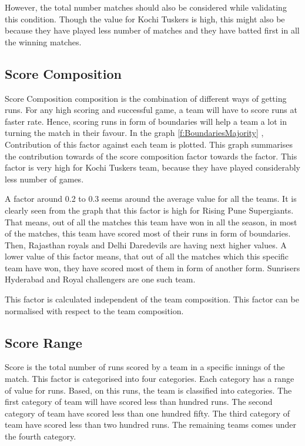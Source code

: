 \documentclass[sigconf]{acmart}
\begin{document}
However, the total number matches should also be considered while validating this condition. Though the value for Kochi Tuskers is high, this might also be because they have played less number of matches and they have batted first in all the winning matches.

\subsection{Score Composition}

Score Composition composition is the combination of different ways of getting runs. For any high scoring and successful game, a team will have to score runs at faster rate. Hence, scoring runs in form of boundaries will help a team a lot in turning the match in their favour.  In the graph \ref{f:BoundariesMajority} , Contribution of this factor against each team is plotted. This graph summarises the contribution towards of the score composition factor towards the factor. This factor is very high for Kochi Tuskers team, because they have played considerably less number of games. 


A factor around 0.2 to 0.3 seems around the average value for all the teams. It is clearly seen from the graph that this factor is high for Rising Pune Supergiants. That means, out of all the matches this team have won in all the season, in most of the matches, this team have scored most of their runs in form of boundaries.  Then, Rajasthan royals and Delhi Daredevils are having next higher values. A lower value of this factor means, that out of all the matches which this specific team have won, they have scored most of them in form of another form. Sunrisers Hyderabad and Royal challengers are one such team.

 
This factor is calculated independent of the team composition. This factor can be normalised with respect to the team composition.

\subsection{Score Range}

Score is the total number of runs scored by a team in a specific innings of the match. This factor is categorised into four categories. Each category has a range of value for runs. Based, on this runs, the team is classified into categories. The first category of team will have scored less than hundred runs. The second category of team have scored less than one hundred fifty. The third category of team have scored less than two hundred runs. The remaining teams comes under the fourth category. 
  
\end{document}
